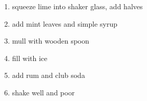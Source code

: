 \documentclass[letter]{recipe}
\begin{document}

\begin{enumerate}
\addtolength{\itemindent}{2em}
 \item squeeze lime into shaker glass, add halves
%
 \item add mint leaves and simple syrup
%
 \item mull with wooden spoon
%
 \item fill with ice
%
 \item add rum and club soda
%
 \item shake well and poor
\end{enumerate}
\end{document}
